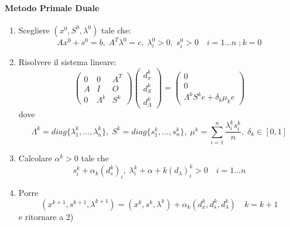 \paragraph{Metodo Primale Duale}
\begin{center}
\fbox
{
 \begin{minipage}[position]{0.85\textwidth}
\begin{enumerate}
\item Scegliere $(x^{0}, S^{0}, \lambda^{0})$ tale che:
   $$ Ax^{0} + s^{0} = b, \; A^{T} \lambda^{0} = c, \;
  \lambda_i^{0}>0, \; s_i^{0}>0 \quad i = 1\ldots n \; ; k=0 $$
\item Risolvere il sistema lineare:
$$
\begin{pmatrix}
 0 & 0 & A^{T} \\
 A & I & O  \\
 0 & \Lambda^{k} & S^{k}
\end{pmatrix}
\begin{pmatrix}
 d_{x}^{k} \\
 d_{S}^{k} \\
 d_{\Lambda}^{k}
\end{pmatrix}
=
\begin{pmatrix}
0 \\
 0 \\
 \Lambda^{k} S^{k} e + \delta_k \mu_k e 
\end{pmatrix}
$$
dove
$$\Lambda^{k} = diag\{ \lambda_1^{k}, \ldots, \lambda_n^{k}\}, \;
S^{k} = diag\{ s_1^{k}, \ldots, s_n^{k}\}, \;
\mu^{k} = \displaystyle \sum_{i=1}^{n} \dfrac{\lambda_i^{k}s_i^{k}}{n}, \;
\delta_k \in [0,1]
$$
\item  Calcolare $\alpha^{k} > 0$ tale che
$$ s_i^{k} + \alpha_k(d_s^{k})_i, \; \lambda_i^{k} + \alpha+k(d_{\lambda})_i^{k}>0
\quad i=1 \ldots n$$
\item Porre $$(x^{k+1}, s^{k+1}, \lambda^{k+1}) = 
  (x^{k}, s^{k}, \lambda^{k}) + \alpha_k(d_x^{k}, d_s^{k}, d_{\lambda}^{k})
\quad k=k+1
$$
e ritornare a 2)
\end{enumerate}
\end{minipage}
}
\end{center}

\outbpdocument


